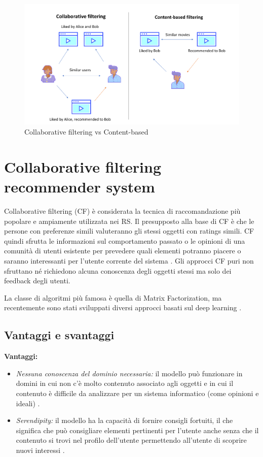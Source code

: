\documentclass[12pt,italian]{report}
\begin{document}
\begin{figure}
  \includegraphics[width=\linewidth]{immagini/cb_cf_schema.png}
  \caption{Collaborative filtering vs Content-based}
  \label{fig:cb-cf}
\end{figure}

\section{Collaborative filtering recommender system}
Collaborative filtering (CF) è considerata la tecnica di raccomandazione più popolare e ampiamente utilizzata nei RS. Il presupposto alla base di CF è che le persone con preferenze simili valuteranno gli stessi oggetti con ratings simili. CF quindi sfrutta le informazioni sul comportamento passato o le opinioni di una comunità di utenti esistente per prevedere quali elementi potranno piacere o saranno interessanti per l'utente corrente del sistema \cite{recsys-intro}. Gli approcci CF puri non sfruttano né richiedono alcuna conoscenza degli oggetti stessi ma solo dei feedback degli utenti.

La classe di algoritmi più famosa è quella di Matrix Factorization, ma recentemente sono stati sviluppati diversi approcci basati sul deep learning \cite{deep-learning-survey}.

\subsection{Vantaggi e svantaggi} \label{ssec:pros-cons-cf}
\textbf{Vantaggi:}
\begin{itemize}

 \item \textit{Nessuna conoscenza del dominio necessaria:} il modello può funzionare in domini in cui non c'è molto contenuto associato agli oggetti e in cui il contenuto è difficile da analizzare per un sistema informatico (come opinioni e ideali) \cite{recsys-principle-methods-evaluation}.
 
 \item \textit{Serendipity:} il modello ha la capacità di fornire consigli fortuiti, il che significa che può consigliare elementi pertinenti per l'utente anche senza che il contenuto si trovi nel profilo dell'utente permettendo all'utente di scoprire nuovi interessi \cite{recsys-principle-methods-evaluation} \cite{cf-advantages-google}.
\end{itemize}
\end{document}
